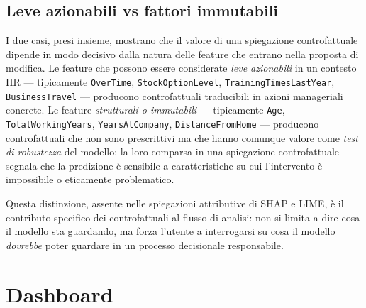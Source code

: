 \subsection{Leve azionabili vs fattori immutabili}

I due casi, presi insieme, mostrano che il valore di una spiegazione controfattuale dipende in modo decisivo dalla natura delle feature che entrano nella proposta di modifica. Le feature che possono essere considerate \emph{leve azionabili} in un contesto HR --- tipicamente \texttt{OverTime}, \texttt{StockOptionLevel}, \texttt{TrainingTimesLastYear}, \texttt{BusinessTravel} --- producono controfattuali traducibili in azioni manageriali concrete. Le feature \emph{strutturali o immutabili} --- tipicamente \texttt{Age}, \texttt{TotalWorkingYears}, \texttt{YearsAtCompany}, \texttt{DistanceFromHome} --- producono controfattuali che non sono prescrittivi ma che hanno comunque valore come \emph{test di robustezza} del modello: la loro comparsa in una spiegazione controfattuale segnala che la predizione è sensibile a caratteristiche su cui l'intervento è impossibile o eticamente problematico.

Questa distinzione, assente nelle spiegazioni attributive di SHAP e LIME, è il contributo specifico dei controfattuali al flusso di analisi: non si limita a dire cosa il modello sta guardando, ma forza l'utente a interrogarsi su cosa il modello \emph{dovrebbe} poter guardare in un processo decisionale responsabile.

\section{Dashboard}
\label{sec:dashboard}

